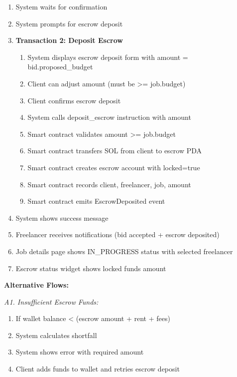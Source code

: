 \documentclass[a4paper,13pt,twoside]{report}
\theoremstyle{definition}
\begin{document}
\begin{enumerate}
\begin{enumerate}
        \item Smart contract sets job.status = IN\_PROGRESS
        \item Smart contract sets job.selected\_freelancer = bid.freelancer
        \item Smart contract sets bid.status = ACCEPTED
        \item Smart contract emits BidAccepted and FreelancerNotification events
    \end{enumerate}
    \item System waits for confirmation
    \item System prompts for escrow deposit
    \item \textbf{Transaction 2: Deposit Escrow}
    \begin{enumerate}
        \item System displays escrow deposit form with amount = bid.proposed\_budget
        \item Client can adjust amount (must be >= job.budget)
        \item Client confirms escrow deposit
        \item System calls deposit\_escrow instruction with amount
        \item Smart contract validates amount >= job.budget
        \item Smart contract transfers SOL from client to escrow PDA
        \item Smart contract creates escrow account with locked=true
        \item Smart contract records client, freelancer, job, amount
        \item Smart contract emits EscrowDeposited event
    \end{enumerate}
    \item System shows success message
    \item Freelancer receives notifications (bid accepted + escrow deposited)
    \item Job details page shows IN\_PROGRESS status with selected freelancer
    \item Escrow status widget shows locked funds amount
\end{enumerate}

\textbf{Alternative Flows:}

\textit{A1. Insufficient Escrow Funds:}
\begin{enumerate}
    \item If wallet balance < (escrow amount + rent + fees)
    \item System calculates shortfall
    \item System shows error with required amount
    \item Client adds funds to wallet and retries escrow deposit
\end{enumerate}
\end{document}
